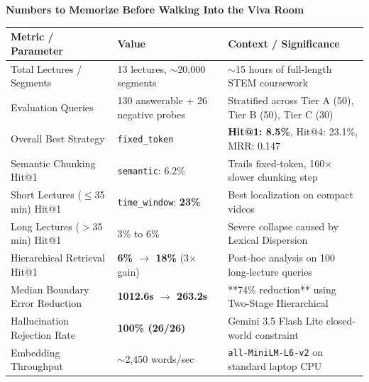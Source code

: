 \documentclass[10pt,a4paper]{article}
\begin{document}
\begin{statbox}
\begin{center}
\textbf{\large Numbers to Memorize Before Walking Into the Viva Room}
\end{center}
\vspace{2pt}
\begin{tabular}{lll}
\toprule
\textbf{Metric / Parameter} & \textbf{Value} & \textbf{Context / Significance} \\
\midrule
Total Lectures / Segments & 13 lectures, $\sim$20,000 segments & $\sim$15 hours of full-length STEM coursework \\
Evaluation Queries & 130 answerable + 26 negative probes & Stratified across Tier A (50), Tier B (50), Tier C (30) \\
Overall Best Strategy & \texttt{fixed\_token} & \textbf{Hit@1: 8.5\%}, Hit@4: 23.1\%, MRR: 0.147 \\
Semantic Chunking Hit@1 & \texttt{semantic}: 6.2\% & Trails fixed-token, 160$\times$ slower chunking step \\
Short Lectures ($\le$35 min) Hit@1 & \texttt{time\_window}: \textbf{23\%} & Best localization on compact videos \\
Long Lectures ($>$35 min) Hit@1 & 3\% to 6\% & Severe collapse caused by Lexical Dispersion \\
Hierarchical Retrieval Hit@1 & \textbf{6\% $\rightarrow$ 18\%} (3$\times$ gain) & Post-hoc analysis on 100 long-lecture queries \\
Median Boundary Error Reduction & \textbf{1012.6s $\rightarrow$ 263.2s} & **74\% reduction** using Two-Stage Hierarchical \\
Hallucination Rejection Rate & \textbf{100\% (26/26)} & Gemini 3.5 Flash Lite closed-world constraint \\
Embedding Throughput & $\sim$2,450 words/sec & \texttt{all-MiniLM-L6-v2} on standard laptop CPU \\
\bottomrule
\end{tabular}
\end{statbox}
\end{document}
